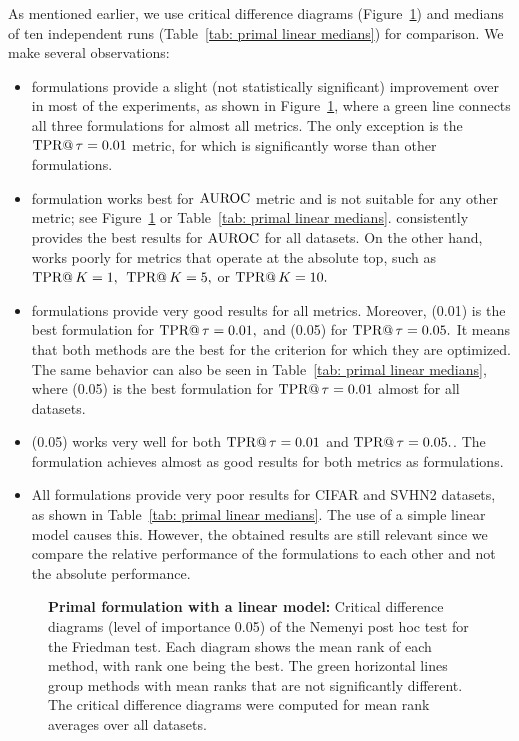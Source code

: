 As mentioned earlier, we use critical difference diagrams (Figure~\ref{fig: primal linear CD}) and medians of ten independent runs (Table~\ref{tab: primal linear medians}) for comparison. We make several observations:
\begin{itemize}
  \item \TopPushK formulations provide a slight (not statistically significant) improvement over \TopPush in most of the experiments, as shown in Figure~\ref{fig: primal linear CD}, where a green line connects all three formulations for almost all metrics. The only exception is the $\operatorname{TPR@}\tau=0.01$ metric, for which \TopPush is significantly worse than other formulations.
  \item \BaseLine formulation works best for $\operatorname{AUROC}$ metric and is not suitable for any other metric; see Figure~\ref{fig: primal linear CD} or Table~\ref{tab: primal linear medians}. \BaseLine consistently provides the best results for $\operatorname{AUROC}$ for all datasets. On the other hand, \BaseLine works poorly for metrics that operate at the absolute top, such as~$\operatorname{TPR@}K = 1,$~$\operatorname{TPR@}K = 5,$ or $\operatorname{TPR@}K = 10.$
  \item \PatMatNP formulations provide very good results for all metrics. Moreover, \PatMatNP(0.01) is the best formulation for $\operatorname{TPR@}\tau = 0.01,$ and \PatMatNP(0.05) for $\operatorname{TPR@}\tau = 0.05.$ It means that both methods are the best for the criterion for which they are optimized. The same behavior can also be seen in Table~\ref{tab: primal linear medians}, where \PatMatNP(0.05) is the best formulation for $\operatorname{TPR@}\tau = 0.01$ almost for all datasets.
  \item \tauFPL(0.05) works very well for both $\operatorname{TPR@}\tau = 0.01$ and $\operatorname{TPR@}\tau = 0.05.$. The formulation achieves almost as good results for both metrics as \PatMatNP formulations.
  \item All formulations provide very poor results for CIFAR and SVHN2 datasets, as shown in Table~\ref{tab: primal linear medians}. The use of a simple linear model causes this. However, the obtained results are still relevant since we compare the relative performance of the formulations to each other and not the absolute performance.
\end{itemize}

\begin{figure}[!p]
  \centering
  
  \caption{\textbf{Primal formulation with a linear model:} Critical difference diagrams (level of importance 0.05) of the Nemenyi post hoc test for the Friedman test. Each diagram shows the mean rank of each method, with rank one being the best. The green horizontal lines group methods with mean ranks that are not significantly different. The critical difference diagrams were computed for mean rank averages over all datasets.}
  \label{fig: primal linear CD}
\end{figure}


